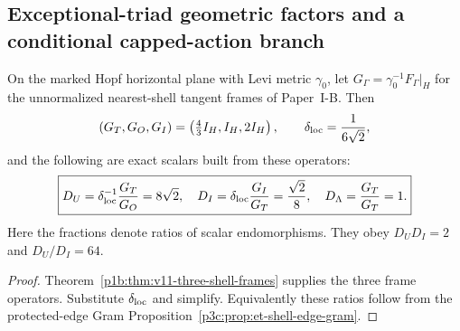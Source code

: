 \documentclass[12pt,a4paper]{article}
\begin{document}
\subsection{Exceptional-triad geometric factors and a conditional capped-action branch}
\label{p3e:sec:et-conditional-branch}

\begin{proposition}
\label{p3e:prop:et-frame-factors}
On the marked Hopf horizontal plane with Levi metric $\gamma_0$,
let $G_\Gamma=\gamma_0^{-1}F_\Gamma|_H$ for the unnormalized
nearest-shell tangent frames of Paper~I-B.  Then
\[
 (G_T,G_O,G_I)=\left(\tfrac43I_H,I_H,2I_H\right),\qquad
 \delta_{\rm loc}=\frac1{6\sqrt2},
\]
and the following are exact scalars built from these operators:
\[
 \boxed{D_U=\delta_{\rm loc}^{-1}\frac{G_T}{G_O}=8\sqrt2,\quad
 D_I=\delta_{\rm loc}\frac{G_I}{G_T}=\frac{\sqrt2}{8},\quad
 D_\Lambda=\frac{G_T}{G_T}=1.}
\]
Here the fractions denote ratios of scalar endomorphisms. They obey
$D_UD_I=2$ and $D_U/D_I=64$.
\end{proposition}
\begin{proof}
Theorem~\ref{p1b:thm:v11-three-shell-frames} supplies the three
frame operators.  Substitute $\delta_{\rm loc}$ and simplify.
Equivalently these ratios follow from the protected-edge Gram
Proposition~\ref{p3c:prop:et-shell-edge-gram}.
\end{proof}
\end{document}
